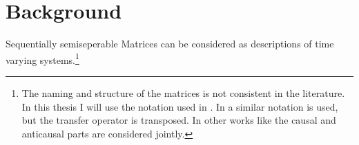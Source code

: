 \documentclass[doctype=mastersthesis,BCOR=15mm,biblatex]{ldvbook}%
\begin{document}



\chapter{Background}\label{chap:background}


Sequentially semiseperable Matrices can be considered as descriptions of time varying systems.\footnote{
The naming and structure of the matrices is not consistent in the literature.
In this thesis I will use the notation used in \cite{tong_blind_2003}. 
In \cite{dewilde_time-varying_1998} a similar notation is used, but the transfer operator is transposed.
In other works like \cite{rice_efficient_2010,chandrasekaran_fast_2002} the causal and anticausal parts are considered jointly.
}
\end{document}
